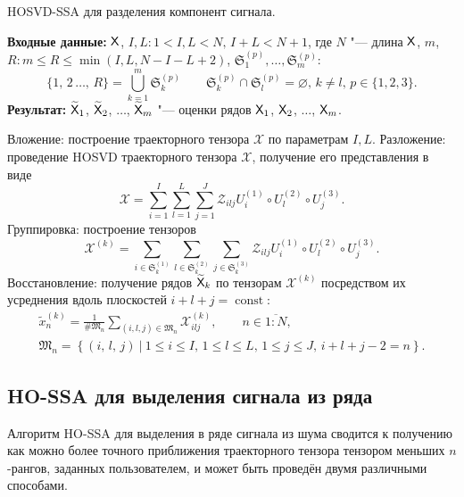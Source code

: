 \documentclass[specialist,
  substylefile=spbu.rtx,
subf,href,colorlinks=true, 12pt]{disser}
\theoremstyle{plain}
\theoremstyle{definition}
\theoremstyle{remark}
\newcommand{\Input}{\textbf{Входные данные: }}
\newcommand{\Output}{\textbf{Результат: }}
\begin{document}
\begin{algorithm}[!h]
  \caption{HOSVD-SSA для разделения компонент сигнала.}
  \label{alg:hosvd-ssa-components}
  \Input $\mathsf{X}$, $I,L: 1< I,L < N,\, I + L < N + 1$, где $N$ "--- длина $\mathsf{X}$,
  $m$,\linebreak $R: m \leqslant R\leqslant \min(I, L, N-I-L+2)$,
  $\mathfrak{S}_1^{(p)}, \ldots, \mathfrak{S}_m^{(p)}$:
  \[
    \{1,\, 2\,\ldots,\, R\}=\bigcup_{k=1}^{m}\mathfrak{S}_k^{(p)} \qquad
    \mathfrak{S}_k^{(p)}\cap \mathfrak{S}_l^{(p)} =\varnothing,\, k\ne l,\, p \in \{1, 2, 3\}.
  \]
  \Output $\widetilde{\mathsf{X}}_1$, $\widetilde{\mathsf{X}}_2$, $\ldots$, $\widetilde{\mathsf{X}}_m$ "--- оценки рядов
  $\mathsf{X}_1$, $\mathsf{X}_2$, $\ldots$, $\mathsf{X}_m$.
  \begin{algorithmic}[1]
    \State \label{alg:first-step}
    Вложение: построение траекторного тензора $\mathcal{X}$ по параметрам $I, L$.
    \State \label{alg:second-step}
    Разложение: проведение HOSVD траекторного тензора $\mathcal{X}$, получение его представления в виде
    \begin{equation}
      \mathcal{X}=\sum_{i=1}^{I} \sum_{l=1}^{L} \sum_{j=1}^{J} \mathcal{Z}_{ilj} U^{(1)}_{i}
      \circ U^{(2)}_{l} \circ U^{(3)}_{j}.
      \label{eq:trajectory-hosvd}
    \end{equation}
    \State Группировка: построение тензоров
    \begin{equation*}
      \mathcal{X}^{(k)}=\sum_{i \in \mathfrak{S}_k^{(1)}} \sum_{l\in \mathfrak{S}_k^{(2)}}
      \sum_{j\in \mathfrak{S}_k^{(3)}}
      \mathcal{Z}_{ilj} U^{(1)}_{i}\circ U^{(2)}_{l} \circ U^{(3)}_{j}.
    \end{equation*}
    \State Восстановление: получение рядов $\widetilde{\mathsf{X}}_k$ по тензорам
    $\mathcal{X}^{(k)}$ посредством их усреднения вдоль
    плоскостей $i+l+j=\operatorname{const}$:
    \begin{gather*}
      \tilde{x}^{(k)}_n=\frac{1}{\#\mathfrak{M}_n}\sum_{(i,l,j)\in \mathfrak{M}_n} \mathcal{X}^{(k)}_{ilj},\qquad n\in \overline{1:N},         \\
      \mathfrak{M}_n=\left\{(i,\, l,\, j)~\Big|~1\leqslant i \leqslant I,\, 1\leqslant l \leqslant L,\, 1\leqslant j \leqslant J,\, i+l+j-2=n\right\}.
    \end{gather*}
  \end{algorithmic}
\end{algorithm}

\subsection{HO-SSA для выделения сигнала из ряда}\label{subsec:ho-ssa-signal}
Алгоритм HO-SSA для выделения в ряде сигнала из шума сводится к получению
как можно более точного приближения траекторного тензора тензором меньших $n$-рангов, заданных пользователем, и
может быть проведён двумя различными способами.
\end{document}
